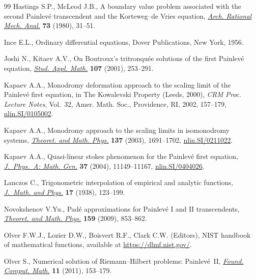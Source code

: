 \documentclass[pdftex]{sigma}
\begin{document}
\begin{thebibliography}{99}
Hastings S.P., McLeod J.B., A boundary value problem associated with the second
 {P}ainlev\'e transcendent and the {K}orteweg--de {V}ries equation,
 \href{https://doi.org/10.1007/BF00283254}{\textit{Arch. Rational Mech. Anal.}} \textbf{73} (1980), 31--51.

Ince E.L., Ordinary differential equations, Dover Publications, New York, 1956.

Joshi N., Kitaev A.V., On {B}outroux's tritronqu\'ee solutions of the first
 {P}ainlev\'e equation, \href{https://doi.org/10.1111/1467-9590.00187}{\textit{Stud. Appl. Math.}} \textbf{107} (2001),
 253--291.

Kapaev A.A., Monodromy deformation approach to the scaling limit of the
 {P}ainlev\'e first equation, in The {K}owalevski Property ({L}eeds, 2000),
 \textit{CRM Proc. Lecture Notes}, Vol.~32, Amer. Math. Soc., Providence, RI,
 2002, 157--179, \href{https://arxiv.org/abs/nlin.SI/0105002}{nlin.SI/0105002}.

Kapaev A.A., Monodromy approach to the scaling limits in isomonodromy systems,
 \href{https://doi.org/10.1023/B:TAMP.0000007917.73394.24}{\textit{Theoret. and Math. Phys.}} \textbf{137} (2003), 1691--1702,
 \href{https://arxiv.org/abs/nlin.SI/0211022}{nlin.SI/0211022}.

Kapaev A.A., Quasi-linear stokes phenomenon for the {P}ainlev\'e first
 equation, \href{https://doi.org/10.1088/0305-4470/37/46/005}{\textit{J.~Phys.~A: Math. Gen.}} \textbf{37} (2004), 11149--11167,
 \href{https://arxiv.org/abs/nlin.SI/0404026}{nlin.SI/0404026}.

Lanczos C., Trigonometric interpolation of empirical and analytic functions,
 \href{https://doi.org/10.1002/sapm1938171123}{\textit{J.~Math. and Phys.}} \textbf{17} (1938), 123--199.

Novokshenov V.Yu., Pad\'e approximations for {P}ainlev\'e {I} and {II}
 transcendents, \href{https://doi.org/10.1007/s11232-009-0073-8}{\textit{Theoret. and Math. Phys.}} \textbf{159} (2009),
 853--862.

Olver F.W.J., Lozier D.W., Boisvert R.F., Clark C.W. (Editors), N{IST} handbook
 of mathematical functions, {a}vailable at \url{https://dlmf.nist.gov/}.

Olver S., Numerical solution of {R}iemann--{H}ilbert problems:
 {P}ainlev\'e~{II}, \href{https://doi.org/10.1007/s10208-010-9079-8}{\textit{Found. Comput. Math.}} \textbf{11} (2011),
 153--179.


\end{thebibliography}
\end{document}

